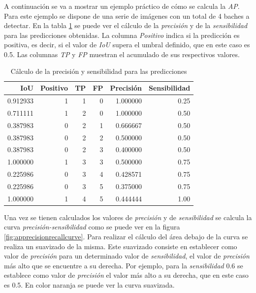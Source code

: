 A continuación se va a mostrar un ejemplo práctico de cómo se calcula la \textit{AP}. Para este ejemplo se dispone de una serie de imágenes con un total de 4 baches a detectar. En la tabla \ref{tab:apprecisionrecalltable} se puede ver el cálculo de la \textit{precisión} y de la \textit{sensibilidad} para las predicciones obtenidas. La columna \textit{Positivo} indica si la predicción es positiva, es decir, si el valor de \textit{IoU} supera el umbral definido, que en este caso es 0.5. Las columnas \textit{TP} y \textit{FP} muestran el acumulado de sus respectivos valores.

\begin{table}[H]
	\centering
	\begin{tabular}{rrrrrr}
		\toprule
		IoU &  Positivo &  TP &  FP &  Precisión &  Sensibilidad \\
		\midrule
		0.912933 &         1 &   1 &   0 &   1.000000 &          0.25 \\
		0.711111 &         1 &   2 &   0 &   1.000000 &          0.50 \\
		0.387983 &         0 &   2 &   1 &   0.666667 &          0.50 \\
		0.387983 &         0 &   2 &   2 &   0.500000 &          0.50 \\
		0.387983 &         0 &   2 &   3 &   0.400000 &          0.50 \\
		1.000000 &         1 &   3 &   3 &   0.500000 &          0.75 \\
		0.225986 &         0 &   3 &   4 &   0.428571 &          0.75 \\
		0.225986 &         0 &   3 &   5 &   0.375000 &          0.75 \\
		1.000000 &         1 &   4 &   5 &   0.444444 &          1.00 \\
		\bottomrule
	\end{tabular}
	\caption{Cálculo de la precisión y sensibilidad para las predicciones}
	\label{tab:apprecisionrecalltable}
\end{table}

Una vez se tienen calculados los valores de \textit{precisión} y de \textit{sensibilidad} se calcula la curva \textit{precisión-sensibilidad} como se puede ver en la figura \ref{fig:apprecisionrecallcurve}. Para realizar el cálculo del área debajo de la curva se realiza un suavizado de la misma. Este suavizado consiste en establecer como valor de \textit{precisión} para un determinado valor de \textit{sensibilidad}, el valor de \textit{precisión} más alto que se encuentre a su derecha. Por ejemplo, para la \textit{sensibilidad} 0.6 se establece como valor de \textit{precisión} el valor más alto a su derecha, que en este caso es 0.5. En color naranja se puede ver la curva suavizada.

